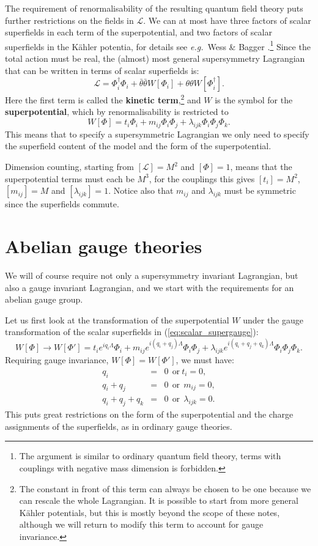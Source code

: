 \documentclass[notes.tex]{subfiles}
\begin{document}
The requirement of renormalisability of the resulting quantum field theory puts further restrictions on the fields in $\mathcal{L}$. We can at most have three factors of scalar superfields in each term of the superpotential, and two factors of scalar superfields in the Kähler potentia,  for details see {\it e.g.}\ Wess \& Bagger \cite{Bagger:1983mv}.\footnote{The argument is similar to ordinary quantum field theory, terms with couplings with negative mass dimension is forbidden.} 
Since the total action must be real, the (almost) most general supersymmetry Lagrangian that can be written in terms of scalar superfields is:
\[\mathcal{L} = \Phi^\dagger_i\Phi_i + \bar{\theta}\bar{\theta}W[\Phi_i] + \theta\theta W[\Phi^\dagger_i].\]
Here the first term is called the {\bf kinetic term},\footnote{The constant in front of this term can always be chosen to be one because we can rescale the whole Lagrangian. It is possible to start from more general Kähler potentials, but this is mostly beyond the scope of these notes, although we will return to modify this term to account for gauge invariance.} and $W$ is the symbol for the {\bf superpotential}, which by renormalisability is restricted to
\begin{equation}
W[\Phi] = t_i \Phi_i + m_{ij}\Phi_i \Phi_j + \lambda_{ijk} \Phi_i \Phi_j \Phi_k.
\end{equation}
This means that to specify a supersymmetric Lagrangian we only need to specify the superfield content of the model and the form of the superpotential. 

Dimension counting, starting from $[\mathcal{L}]=M^2$ and $[\Phi]=1$, means that the superpotential terms must each be $M^3$, for the couplings this gives $[t_i]=M^2$, $[m_{ij}]=M$ and $[\lambda_{ijk}]=1$. Notice also that $m_{ij}$ and $\lambda_{ijk}$ must be symmetric since the superfields commute.



\section[Albanian gauge theories]{Abelian gauge theories}
We will of course require not only a supersymmetry invariant Lagrangian, but also a gauge invariant Lagrangian, and we start with the requirements for an abelian gauge group. 

Let us first look at the transformation of the superpotential $W$ under the gauge transformation of the scalar superfields in (\ref{eq:scalar_supergauge}):
\[W[\Phi] \to W[\Phi'] = t_i e^{iq_i\Lambda }\Phi_i + m_{ij}e^{i(q_i+q_j)\Lambda}\Phi_i\Phi_j + \lambda_{ijk}e^{i(q_i+q_j+q_k)\Lambda}\Phi_i\Phi_j\Phi_k.\]
Requiring gauge invariance, $W[\Phi] = W[\Phi']$, we must have:
\begin{eqnarray}
q_i &=& 0 ~~\text{or}~t_i = 0, \\
q_i+q_j &=& 0 ~~\text{or}~~m_{ij} = 0,  \\
q_i+q_j+q_k &=& 0  ~~\text{or}~~ \lambda_{ijk}=0.
\end{eqnarray}
This puts great restrictions on the form of the superpotential and the charge assignments of the superfields, as in ordinary gauge theories. 
\end{document}
